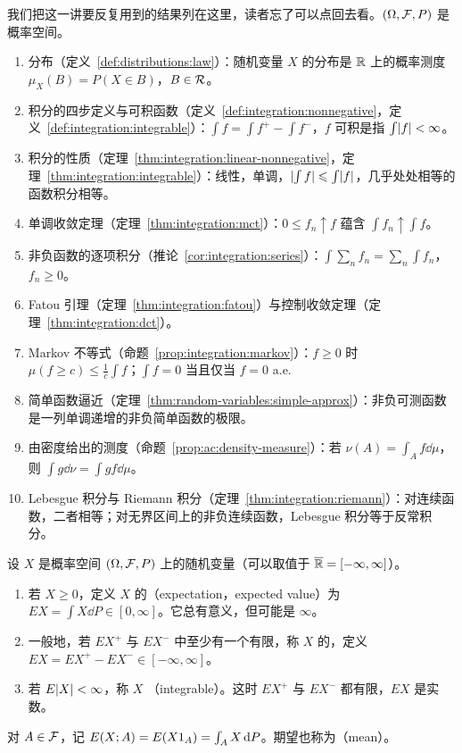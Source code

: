 我们把这一讲要反复用到的结果列在这里，读者忘了可以点回去看。$(\Omega,\mathcal{F},P)$ 是概率空间。
\begin{enumerate}
\item 分布（定义~\ref{def:distributions:law}）：随机变量 $X$ 的分布是 $\mathbb{R}$ 上的概率测度 $\mu_X(B)=P(X\in B)$，$B\in\mathcal{R}$。
\item 积分的四步定义与可积函数（定义~\ref{def:integration:nonnegative}，定义~\ref{def:integration:integrable}）：$\int f=\int f^+-\int f^-$，$f$ 可积是指 $\int\lvert f\rvert<\infty$。
\item 积分的性质（定理~\ref{thm:integration:linear-nonnegative}，定理~\ref{thm:integration:integrable}）：线性，单调，$\lvert \int f\rvert\leqslant\int\lvert f\rvert$，几乎处处相等的函数积分相等。
\item 单调收敛定理（定理~\ref{thm:integration:mct}）：$0\leqslant f_n\uparrow f$ 蕴含 $\int f_n\uparrow\int f$。
\item 非负函数的逐项积分（推论~\ref{cor:integration:series}）：$\int\sum_nf_n=\sum_n\int f_n$，$f_n\geqslant0$。
\item Fatou 引理（定理~\ref{thm:integration:fatou}）与控制收敛定理（定理~\ref{thm:integration:dct}）。
\item Markov 不等式（命题~\ref{prop:integration:markov}）：$f\geqslant0$ 时 $\mu(f\geqslant c)\leqslant\frac1c\int f$；$\int f=0$ 当且仅当 $f=0$ a.e.
\item 简单函数逼近（定理~\ref{thm:random-variables:simple-approx}）：非负可测函数是一列单调递增的非负简单函数的极限。
\item 由密度给出的测度（命题~\ref{prop:ac:density-measure}）：若 $\nu(A)=\int_Af\dd\mu$，则 $\int g\dd\nu=\int gf\dd\mu$。
\item Lebesgue 积分与 Riemann 积分（定理~\ref{thm:integration:riemann}）：对连续函数，二者相等；对无界区间上的非负连续函数，Lebesgue 积分等于反常积分。
\end{enumerate}


\begin{definition}[期望]\label{def:expectation:expectation}
设 $X$ 是概率空间 $(\Omega,\mathcal{F},P)$ 上的随机变量（可以取值于 $\overline{\mathbb{R}}=[-\infty,\infty]$）。
\begin{enumerate}
\item 若 $X\geqslant0$，定义 $X$ 的（expectation，expected value）为 $EX=\int X\dd P\in[0,\infty]$。它总有意义，但可能是 $\infty$。
\item 一般地，若 $EX^+$ 与 $EX^-$ 中至少有一个有限，称 $X$ 的，定义 $EX=EX^+-EX^-\in[-\infty,\infty]$。
\item 若 $E\lvert X\rvert<\infty$，称 $X$ （integrable）。这时 $EX^+$ 与 $EX^-$ 都有限，$EX$ 是实数。
\end{enumerate}
对 $A\in\mathcal{F}$，记 $E(X;A)=E(X1_A)=\int_AX\,\mathrm{d} P$。期望也称为（mean）。
\end{definition}

